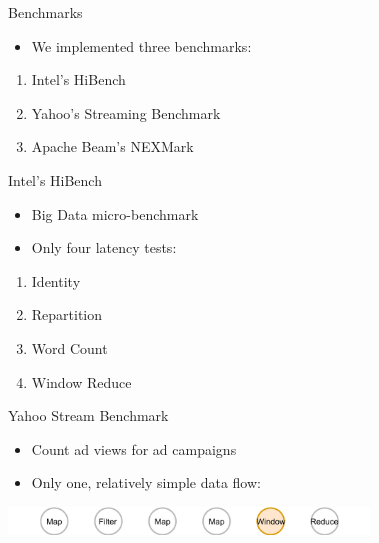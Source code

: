 \documentclass[14pt,t]{beamer}
\renewcommand{\title}[1]{
  {\huge #1} \vskip 0.4cm
}
\begin{document}
\begin{frame}
  \title{Benchmarks}
  \begin{itemize}
  \item We implemented three benchmarks:
  \end{itemize}
  \begin{enumerate}
  \item Intel's HiBench
  \item Yahoo's Streaming Benchmark
  \item Apache Beam's NEXMark
  \end{enumerate}
\end{frame}

\begin{frame}
  \title{Intel's HiBench}
  \begin{itemize}
  \item Big Data micro-benchmark
  \item Only four latency tests:
  \end{itemize}
  \begin{enumerate}
  \item Identity \hfill{}
  \item Repartition \hfill{}
  \item Word Count \hfill{}
  \item Window Reduce \hfill{}
  \end{enumerate}
\end{frame}

\begin{frame}
  \title{Yahoo Stream Benchmark}
  \begin{itemize}
  \item Count ad views for ad campaigns
  \item Only one, relatively simple data flow:
  \end{itemize}
  \includegraphics[height=0.75cm]{ysb.png}
\end{frame}
\end{document}
